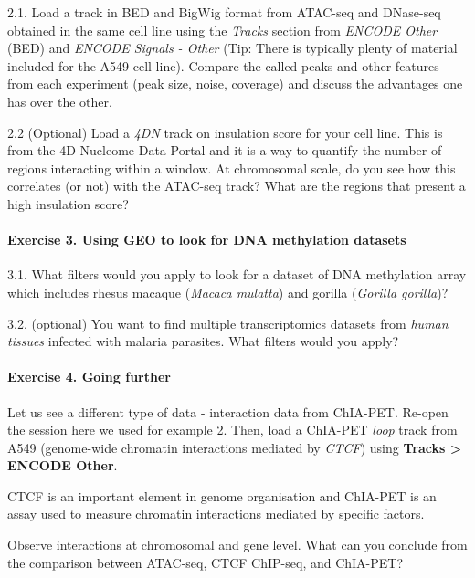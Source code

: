 \documentclass[
]{book}
\begin{document}
2.1. Load a track in BED and BigWig format from ATAC-seq and DNase-seq obtained in the same cell line using the \emph{Tracks} section from \emph{ENCODE Other} (BED) and \emph{ENCODE Signals - Other} (Tip: There is typically plenty of material included for the A549 cell line). Compare the called peaks and other features from each experiment (peak size, noise, coverage) and discuss the advantages one has over the other.

2.2 (Optional) Load a \emph{4DN} track on insulation score for your cell line. This is from the 4D Nucleome Data Portal and it is a way to quantify the number of regions interacting within a window. At chromosomal scale, do you see how this correlates (or not) with the ATAC-seq track? What are the regions that present a high insulation score?

\hypertarget{exercise-3.-using-geo-to-look-for-dna-methylation-datasets}{%
\paragraph{Exercise 3. Using GEO to look for DNA methylation datasets}\label{exercise-3.-using-geo-to-look-for-dna-methylation-datasets}}

3.1. What filters would you apply to look for a dataset of DNA methylation array which includes rhesus macaque (\emph{Macaca mulatta}) and gorilla (\emph{Gorilla gorilla})?

3.2. (optional) You want to find multiple transcriptomics datasets from \emph{human tissues} infected with malaria parasites. What filters would you apply?

\hypertarget{exercise-4.-going-further}{%
\paragraph{Exercise 4. Going further}\label{exercise-4.-going-further}}

Let us see a different type of data - interaction data from ChIA-PET. Re-open the session \href{IGV_sessions/ExampleATAC_ChIP_CTCF_hg38.json}{here} we used for example 2. Then, load a ChIA-PET \emph{loop} track from A549 (genome-wide chromatin interactions mediated by \emph{CTCF}) using \textbf{Tracks \textgreater{} ENCODE Other}.

CTCF is an important element in genome organisation and ChIA-PET is an assay used to measure chromatin interactions mediated by specific factors.

Observe interactions at chromosomal and gene level. What can you conclude from the comparison between ATAC-seq, CTCF ChIP-seq, and ChIA-PET?
\end{document}
